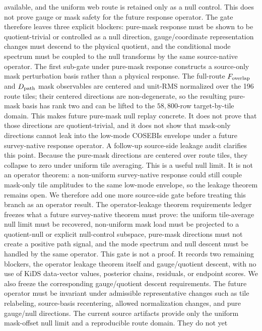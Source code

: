 \documentclass[11pt]{article}
\begin{document}
available, and the uniform web route is retained only as a null control. This
does not prove gauge or mask safety for the future response operator. The gate
therefore leaves three explicit blockers: pure-mask response must be shown to
be quotient-trivial or controlled as a null direction, gauge/coordinate
representation changes must descend to the physical quotient, and the
conditional mode spectrum must be coupled to the null transforms by the same
source-native operator.
The first sub-gate under pure-mask response constructs a source-only mask
perturbation basis rather than a physical response. The full-route
\(F_{\rm overlap}\) and \(D_{\rm path}\) mask observables are centered and
unit-RMS normalized over the 196 route tiles; their centered directions are
non-degenerate, so the resulting pure-mask basis has rank two and can be lifted
to the \(58{,}800\)-row target-by-tile domain. This makes future pure-mask null
replay concrete. It does not prove that those directions are quotient-trivial,
and it does not show that mask-only directions cannot leak into the low-mode
COSEBIs envelope under a future survey-native response operator.
A follow-up source-side leakage audit clarifies this point. Because the
pure-mask directions are centered over route tiles, they collapse to zero under
uniform tile averaging. This is a useful null limit. It is not an operator
theorem: a non-uniform survey-native response could still couple mask-only
tile amplitudes to the same low-mode envelope, so the leakage theorem remains
open.
We therefore add one more source-side gate before treating this branch as an
operator result. The operator-leakage theorem requirements ledger freezes what
a future survey-native theorem must prove: the uniform tile-average null limit
must be recovered, non-uniform mask load must be projected to a quotient-null or
explicit null-control subspace, pure-mask directions must not create a positive
path signal, and the mode spectrum and null descent must be handled by the same
operator. This gate is not a proof. It records two remaining blockers, the
operator leakage theorem itself and gauge/quotient descent, with no use of KiDS
data-vector values, posterior chains, residuals, or endpoint scores.
We also freeze the corresponding gauge/quotient descent requirements. The
future operator must be invariant under admissible representative changes such
as tile relabeling, source-basis recentering, allowed normalization changes,
and pure gauge/null directions. The current source artifacts provide only the
uniform mask-offset null limit and a reproducible route domain. They do not yet
\end{document}
